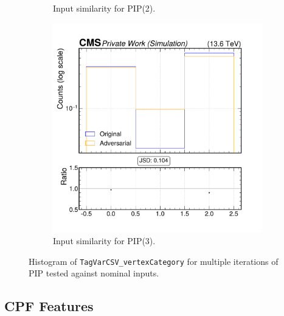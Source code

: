 \begin{figure}[h]
\begin{subfigure}[t]{0.32\textwidth}
    \caption{Input similarity for PIP(2).}
  \end{subfigure}\hfill
  \begin{subfigure}[t]{0.32\textwidth}
    \includegraphics[width=\linewidth]{media/output/features/compare/intprob_3/cmp_global_features_TagVarCSV_vertexCategory.pdf}
    \caption{Input similarity for PIP(3).}
  \end{subfigure}

  \caption{Histogram of \texttt{TagVarCSV\_vertexCategory} for multiple iterations of PIP tested against nominal inputs.}
  \label{fig:intprob_input_TagVarCSV_vertexCategory}
\end{figure}

\FloatBarrier
\newpage
\subsection*{CPF Features}


